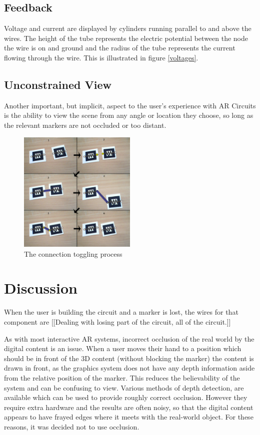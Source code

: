 \subsection{Feedback}
Voltage and current are displayed by cylinders running parallel to and above
the wires. The height of the tube represents the electric potential between the
node the wire is on and ground and the radius of the tube represents the current
flowing through the wire. This is illustrated in figure \ref{voltages}.


\subsection{Unconstrained View}
Another important, but implicit, aspect to the
user's experience with AR Circuits is the ability to view the scene from any
angle or location they choose, so long as the relevant markers are not occluded
or too distant.

\begin{figure}
\begin{center}
\includegraphics[width=0.50\textwidth]{connection}
\end{center}
\caption{The connection toggling process}
\label{connection}
\end{figure}

\section{Discussion}

When the user is building the circuit and a marker is lost, the wires for that component are
[[Dealing with losing part of the circuit, all of the circuit.]]

As with most interactive AR systems, incorrect occlusion of the real world by the digital content is an issue. When a user moves their hand to a position which should be in front of the 3D content (without blocking the marker) the content is drawn in front, as the graphics system does not have any depth information aside from the relative position of the marker. This reduces the believability of the system and can be confusing to view. Various methods of depth detection, are available which can be used to provide roughly correct occlusion. However they require extra hardware and the results are often noisy, so that the digital content appears to have frayed edges where it meets with the real-world object. For these reasons, it was decided not to use occlusion.

